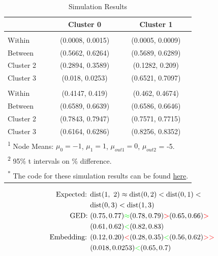 \documentclass[
  11pt,
  letterpaper,
]{article}
\begin{document}
\begin{longtable}[t]{lcc}
\caption{Simulation Results} \label{tab-sim}\\
\toprule
  & Cluster 0 & Cluster 1\\
\midrule
\addlinespace[0.3em]
\multicolumn{3}{l}{\textbf{Embeddings}}\\
\hspace{1em}Within & (0.0008, 0.0015) & (0.0005, 0.0009)\\
\hspace{1em}Between & (0.5662, 0.6264) & (0.5689, 0.6289)\\
\hspace{1em}Cluster 2 & (0.2894, 0.3589) & (0.1282, 0.209)\\
\hspace{1em}Cluster 3 & (0.018, 0.0253) & (0.6521, 0.7097)\\
\addlinespace[0.3em]
\multicolumn{3}{l}{\textbf{GED}}\\
\hspace{1em}Within & (0.4147, 0.419) & (0.462, 0.4674)\\
\hspace{1em}Between & (0.6589, 0.6639) & (0.6586, 0.6646)\\
\hspace{1em}Cluster 2 & (0.7843, 0.7947) & (0.7571, 0.7715)\\
\hspace{1em}Cluster 3 & (0.6164, 0.6286) & (0.8256, 0.8352)\\
\bottomrule
\multicolumn{3}{l}{\rule{0pt}{1em}\textsuperscript{1} Node Means: $\mu_0 = -1$, $\mu_1 = 1$, $\mu_{out1} = 0$, 
                    $\mu_{out2}$ = -5.}\\
\multicolumn{3}{l}{\rule{0pt}{1em}\textsuperscript{2} 95\% t intervals on \% difference.}\\
\multicolumn{3}{l}{\rule{0pt}{1em}\textsuperscript{*} The code for these simulation results can be found \href{https://github.com/Tiny-Quant/GNN-EGG/blob/pre-release/notebooks/CS-8321-Final-Paper-Code.ipynb}{here}.}\\
\end{longtable}

\begin{equation} \label{eq-sim}
    \begin{split}
        \text{Expected: } &\text{dist}(1,\ 2) \approx \text{dist}(0, 2) < \text{dist}(0, 1) < \\ 
        &\text{dist}(0, 3) < \text{dist}(1, 3) \\ 
        \text{GED: }&(0.75, 0.77) \textcolor{green}{\approx} (0.78, 0.79) 
                    \textcolor{red}{>} (0.65, 0.66) \textcolor{red}{>} \\
                    &(0.61, 0.62) \textcolor{green}{<} (0.82, 0.83) \\
        \text{Embedding: }&(0.12, 0.20) \textcolor{red}{<} (0.28, 0.35) 
                    \textcolor{green}{<} (0.56, 0.62) \textcolor{red}{>>} \\
                    &(0.018, 0.0253) \textcolor{green}{<} (0.65, 0.7)
        \end{split}
\end{equation}
\end{document}
